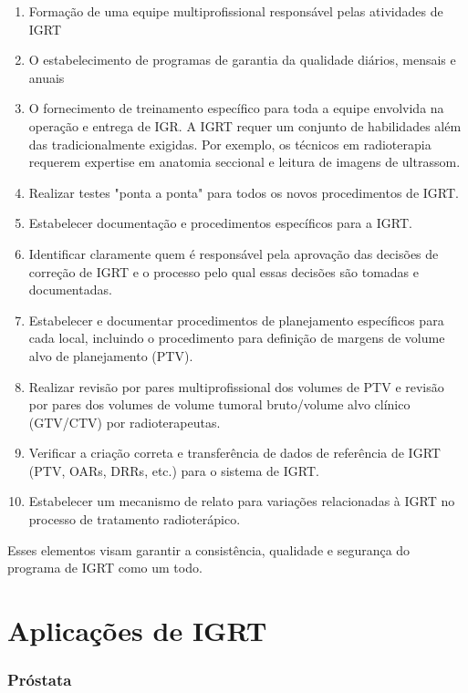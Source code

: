 \documentclass[11pt,a4paper]{article}
\newcounter{exemplo}
\begin{document}
	\begin{enumerate}
		\item Formação de uma equipe multiprofissional responsável pelas atividades de IGRT
		\item O estabelecimento de programas de garantia da qualidade diários, mensais e anuais
		\item O fornecimento de treinamento específico para toda a equipe envolvida na operação e entrega de IGR. A IGRT requer um conjunto de habilidades além das tradicionalmente exigidas. Por exemplo, os técnicos em radioterapia requerem expertise em anatomia seccional e leitura de imagens de ultrassom.
		\item Realizar testes "ponta a ponta" para todos os novos procedimentos de IGRT.
		\item Estabelecer documentação e procedimentos específicos para a IGRT.
		\item Identificar claramente quem é responsável pela aprovação das decisões de correção de IGRT e o processo pelo qual essas decisões são tomadas e documentadas.
		\item Estabelecer e documentar procedimentos de planejamento específicos para cada local, incluindo o procedimento para definição de margens de volume alvo de planejamento (PTV).
		\item Realizar revisão por pares multiprofissional dos volumes de PTV e revisão por pares dos volumes de volume tumoral bruto/volume alvo clínico (GTV/CTV) por radioterapeutas.
		\item Verificar a criação correta e transferência de dados de referência de IGRT (PTV, OARs, DRRs, etc.) para o sistema de IGRT.
		\item Estabelecer um mecanismo de relato para variações relacionadas à IGRT no processo de tratamento radioterápico.
	\end{enumerate}
	
	Esses elementos visam garantir a consistência, qualidade e segurança do programa de IGRT como um todo.

\section{Aplicações de IGRT}

\subsubsection*{Próstata}
\end{document}

